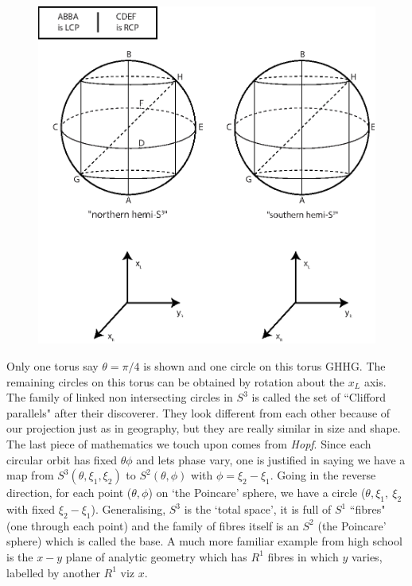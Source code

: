 \begin{figure}[H]
\centering
\includegraphics[scale=0.425]{src/images/chap26/15.jpg}\label{diags3}
\end{figure}
\bigskip

Only one torus say $\theta  = \pi/4$ is shown and one circle on this torus GHHG.
The remaining circles on this torus can be obtained by rotation about the $x_L$ axis.
The family of linked non intersecting circles in $S^3$ is called the set of ``Clifford
parallels" after their discoverer. They
look different from each other because of our projection just as in geography,
but they are really similar in size and shape. The last piece of mathematics
we touch upon comes from \textit{Hopf}. Since each circular orbit has fixed $\theta \phi$ and
lets phase vary, one is justified in saying we have a map from $S^3 (\theta, \xi_1, \xi_2)$ to
$S^2 (\theta, \phi)$ with $\phi = \xi_2 - \xi_1$. Going in the reverse direction, for each point ($\theta, \phi$) on
`the Poincare' sphere, we have a circle ($\theta, \xi_1,~ \xi_2$ with fixed $\xi_2 - \xi_1$). Generalising, $S^3$ is the `total space', it is full of $S^1$ ``fibres" (one through each point) and the family of fibres itself is an $S^2$ (the Poincare' sphere) which is called the base.
A much more familiar example from high school is the $x - y$ plane of analytic
geometry which has $R^1$ fibres in which $y$ varies, labelled by another $R^1$ viz $x$.
\bigskip

